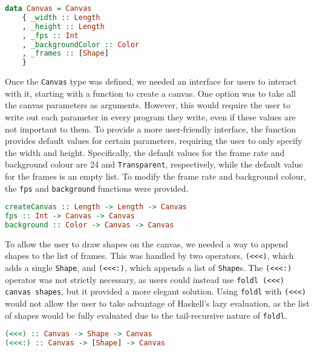 \documentclass[../main.tex]{subfiles}
\begin{document}
        \begin{lstlisting}[language={Haskell}, label={lst:canvas}, caption={The \texttt{Canvas} type 
            definition.}]
data Canvas = Canvas
    { _width :: Length
    , _height :: Length
    , _fps :: Int
    , _backgroundColor :: Color
    , _frames :: [Shape]
    }\end{lstlisting}

        Once the \texttt{Canvas} type was defined, we needed an interface for users to
            interact with it, starting with a function to create a canvas.
        One option was to take all the canvas parameters as arguments.
        However, this would require the user to write out each parameter in every
            program they write, even if these values are not important to them.
        To provide a more user-friendly interface, the function provides default values
            for certain parameters, requiring the user to only specify the width and
            height.
        Specifically, the default values for the frame rate and background colour are
            24 and \texttt{Transparent}, respectively, while the default value for the
            frames is an empty list.
        To modify the frame rate and background colour, the \texttt{fps} and
            \texttt{background} functions were provided.

        \begin{lstlisting}[language={Haskell}, label={lst:fps}, caption={The \texttt{createCanvas}, \texttt{fps} and 
            \texttt{backgrounds} functions.}]
createCanvas :: Length -> Length -> Canvas
fps :: Int -> Canvas -> Canvas
background :: Color -> Canvas -> Canvas\end{lstlisting}

        To allow the user to draw shapes on the canvas, we needed a way to append
            shapes to the list of frames.
        This was handled by two operators, \texttt{(<<<)}, which adds a single
            \texttt{Shape}, and \texttt{(<<<:)}, which appends a list of \texttt{Shape}s.
        The \texttt{(<<<:)} operator was not strictly necessary, as users could instead
            use \texttt{foldl (<<<) canvas shapes}, but it provided a more elegant
            solution.
        Using \texttt{foldl} with \texttt{(<<<)} would not allow the user to take
            advantage of Haskell's lazy evaluation, as the list of shapes would be fully
            evaluated due to the tail-recursive nature of \texttt{foldl}.

        \begin{lstlisting}[language={Haskell}, label={lst:<<<}, caption={The operators to append a 
            frame to the canvas.}]
(<<<) :: Canvas -> Shape -> Canvas
(<<<:) :: Canvas -> [Shape] -> Canvas\end{lstlisting}
\end{document}
